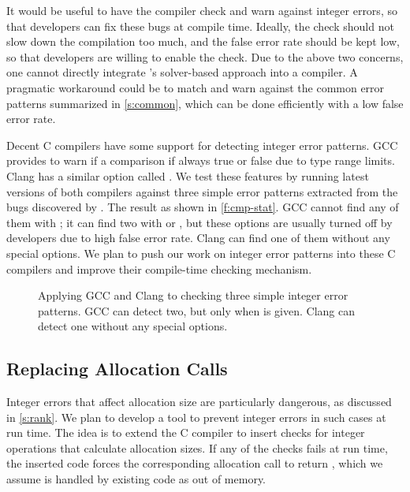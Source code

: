 It would be useful to have the compiler check and warn against
integer errors, so that developers can fix these bugs
at compile time.  Ideally, the check should not slow down
the compilation too much, and the false error rate should be kept low,
so that developers are willing to enable the check.
%
Due to the above two concerns, one cannot directly integrate
\sys's solver-based approach into a compiler.  A pragmatic workaround
could be to match and warn against the common error patterns
summarized in \autoref{s:common}, which can be done efficiently
with a low false error rate.

Decent C compilers have some support for detecting integer error
patterns.
%
GCC provides  to warn if a comparison if always
true or false due to type range limits.
%
Clang has a similar option called .
%
We test these features by running latest versions of both compilers
against three simple error patterns extracted from the bugs discovered
by \sys.  The result as shown in \autoref{f:cmp-stat}.  GCC cannot
find any of them with ; it can find two with 
or , but these options are usually turned off by
developers due to high false error rate.  Clang can find one of them
without any special options.
%
%
We plan to push our work on integer error patterns into these C
compilers and improve their compile-time checking mechanism.

\begin{figure}
\centering

\caption{Applying GCC and Clang to checking three simple integer
error patterns.  GCC can detect two, but only when  is
given.  Clang can detect one without any special options.}
\label{f:cmp-stat}
\end{figure}

\subsection{Replacing Allocation Calls}

Integer errors that affect allocation size are particularly dangerous,
as discussed in \autoref{s:rank}.
We plan to develop a tool to prevent integer errors
in such cases at run time.
The idea is to extend the C compiler
to insert checks for integer operations that calculate allocation sizes.
If any of the checks fails at run time,
the inserted code forces the corresponding allocation call to return
, which we assume is handled by existing code
as out of memory.

